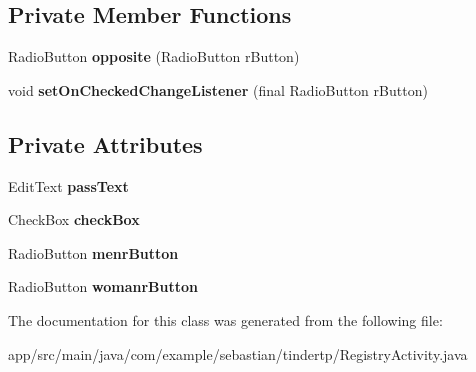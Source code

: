 \subsection*{Private Member Functions}
\begin{DoxyCompactItemize}
\item 
Radio\+Button {\bfseries opposite} (Radio\+Button r\+Button)\hypertarget{classcom_1_1example_1_1sebastian_1_1tindertp_1_1RegistryActivity_a6525e74987d8dd7addb08d4afcbfcab1}{}\label{classcom_1_1example_1_1sebastian_1_1tindertp_1_1RegistryActivity_a6525e74987d8dd7addb08d4afcbfcab1}

\item 
void {\bfseries set\+On\+Checked\+Change\+Listener} (final Radio\+Button r\+Button)\hypertarget{classcom_1_1example_1_1sebastian_1_1tindertp_1_1RegistryActivity_a07db86618d9340272335484f2de24caa}{}\label{classcom_1_1example_1_1sebastian_1_1tindertp_1_1RegistryActivity_a07db86618d9340272335484f2de24caa}

\end{DoxyCompactItemize}
\subsection*{Private Attributes}
\begin{DoxyCompactItemize}
\item 
Edit\+Text {\bfseries pass\+Text}\hypertarget{classcom_1_1example_1_1sebastian_1_1tindertp_1_1RegistryActivity_a8c255ef50f0e59664d360cbfcf735720}{}\label{classcom_1_1example_1_1sebastian_1_1tindertp_1_1RegistryActivity_a8c255ef50f0e59664d360cbfcf735720}

\item 
Check\+Box {\bfseries check\+Box}\hypertarget{classcom_1_1example_1_1sebastian_1_1tindertp_1_1RegistryActivity_a0b83a67a48b121384d15a4558ae271d9}{}\label{classcom_1_1example_1_1sebastian_1_1tindertp_1_1RegistryActivity_a0b83a67a48b121384d15a4558ae271d9}

\item 
Radio\+Button {\bfseries menr\+Button}\hypertarget{classcom_1_1example_1_1sebastian_1_1tindertp_1_1RegistryActivity_a5ad51b456ed80d9581713496ae51031b}{}\label{classcom_1_1example_1_1sebastian_1_1tindertp_1_1RegistryActivity_a5ad51b456ed80d9581713496ae51031b}

\item 
Radio\+Button {\bfseries womanr\+Button}\hypertarget{classcom_1_1example_1_1sebastian_1_1tindertp_1_1RegistryActivity_a3c63b9b1730c42df661423490c39d175}{}\label{classcom_1_1example_1_1sebastian_1_1tindertp_1_1RegistryActivity_a3c63b9b1730c42df661423490c39d175}

\end{DoxyCompactItemize}


The documentation for this class was generated from the following file\+:\begin{DoxyCompactItemize}
\item 
app/src/main/java/com/example/sebastian/tindertp/Registry\+Activity.\+java\end{DoxyCompactItemize}
